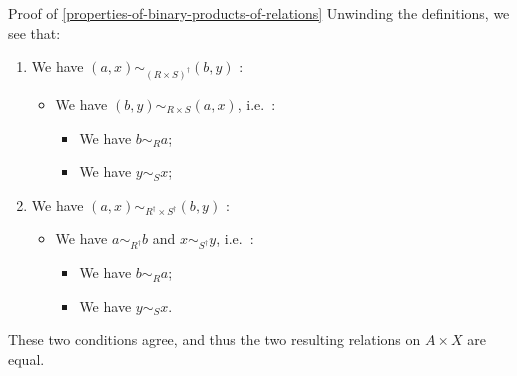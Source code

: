 \begin{Proof}{Proof of \cref{properties-of-binary-products-of-relations}}%
    Unwinding the definitions, we see that:
    \begin{enumerate}
        \item We have $(a,x)\sim_{(R\times S)^{\dagger}}(b,y)$ \textiff:
            \begin{itemize}
                \item We have $(b,y)\sim_{R\times S}(a,x)$, i.e.\ \textiff:
                    \begin{itemize}
                        \item We have $b\sim_{R}a$;
                        \item We have $y\sim_{S}x$;
                    \end{itemize}
            \end{itemize}
        \item We have $(a,x)\sim_{R^{\dagger}\times S^{\dagger}}(b,y)$ \textiff:
            \begin{itemize}
                \item We have $a\sim_{R^{\dagger}}b$ and $x\sim_{S^{\dagger}}y$, i.e.\ \textiff:
                    \begin{itemize}
                        \item We have $b\sim_{R}a$;
                        \item We have $y\sim_{S}x$.
                    \end{itemize}
            \end{itemize}
    \end{enumerate}
    These two conditions agree, and thus the two resulting relations on $A\times X$ are equal.


\end{Proof}
